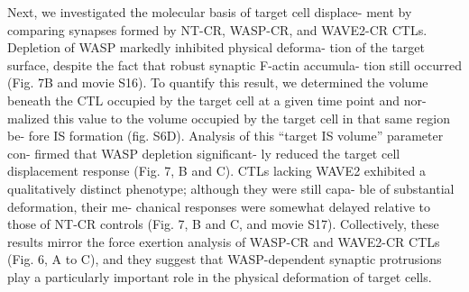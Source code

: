Next, we investigated the molecular basis of target cell displace- ment by comparing synapses formed by NT-CR, WASP-CR, and WAVE2-CR CTLs. Depletion of WASP markedly inhibited physical deforma- tion of the target surface, despite the fact that robust synaptic F-actin accumula- tion still occurred (Fig. 7B and movie S16). To quantify this result, we determined the volume beneath the CTL occupied by the target cell at a given time point and nor- malized this value to the volume occupied by the target cell in that same region be- fore IS formation (fig. S6D). Analysis of this “target IS volume” parameter con- firmed that WASP depletion significant- ly reduced the target cell displacement response (Fig. 7, B and C). CTLs lacking WAVE2 exhibited a qualitatively distinct phenotype; although they were still capa- ble of substantial deformation, their me- chanical responses were somewhat delayed relative to those of NT-CR controls (Fig. 7, B and C, and movie S17). Collectively, these results mirror the force exertion analysis of WASP-CR and WAVE2-CR CTLs (Fig. 6, A to C), and they suggest that WASP-dependent synaptic protrusions play a particularly important role in the physical deformation of target cells.

